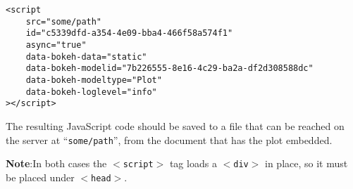 \documentclass[a4paper,12pt]{article}
\begin{document}
\begin{framed}
	\begin{verbatim}
<script
    src="some/path"
    id="c5339dfd-a354-4e09-bba4-466f58a574f1"
    async="true"
    data-bokeh-data="static"
    data-bokeh-modelid="7b226555-8e16-4c29-ba2a-df2d308588dc"
    data-bokeh-modeltype="Plot"
    data-bokeh-loglevel="info"
></script>
\end{verbatim}
\end{framed}
The resulting JavaScript code should be saved to a file that can be reached on the server at “\texttt{some/path}”, from the document that has the plot embedded.

\noindent \textbf{Note}:In both cases the $<$\texttt{script}$>$ tag loads a $<$\texttt{div}$>$ in place, so it must be placed under $<$\texttt{head}$>$.
\end{document}
